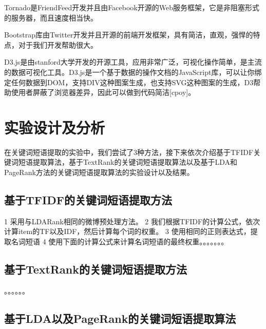 \documentclass[master]{njuthesis}
\begin{document}
    Tornado是FriendFeed开发并且由Facebook开源的Web服务框架，它是非阻塞形式的服务器，而且速度相当快。
    
    Bootstrap库由Twitter开发并且开源的前端开发框架，具有简洁，直观，强悍的特点，对于我们开发帮助很大。
    
    D3.js是由stanford大学开发的开源工具，应用非常广泛，可视化操作简单，是主流的数据可视化工具。D3.js是一个基于数据的操作文档的JavaScript库，可以让你绑定任何数据到DOM，支持DIV这种图案生成，也支持SVG这种图案的生成，D3帮助使用者屏蔽了浏览器差异，因此可以做到代码简洁[cpoy]。


\section{实验设计及分析}
  
    在关键词短语提取的实验中，我们尝试了3种方法，接下来依次介绍基于TFIDF关键词短语提取算法，基于TextRank的关键词短语提取算法以及基于LDA和PageRank方法的关键词短语提取算法的实验设计以及结果。

\subsection{基于TFIDF的关键词短语提取方法}

    1 采用与LDARank相同的微博预处理方法。
    2 我们根据TFIDF的计算公式，依次计算item的TF以及IDF，然后计算每个词的权重。
    3 使用相同的正则表达式，提取名词短语
    4 使用下面的计算公式来计算名词短语的最终权重。。。。。。。

\subsection{基于TextRank的关键词短语提取方法}
    。。。。。。

\subsection{基于LDA以及PageRank的关键词短语提取算法}
  
\end{document}

